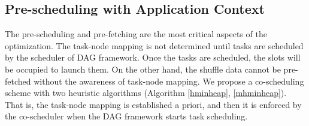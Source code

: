 \subsection{Pre-scheduling with Application Context}
The pre-scheduling and pre-fetching are the most critical aspects of the optimization. 
The task-node mapping is not determined until tasks are scheduled by the scheduler of DAG framework. 
Once the tasks are scheduled, the slots will be occupied to launch them. 
On the other hand, the shuffle data cannot be pre-fetched without the awareness of task-node mapping.
We propose a co-scheduling scheme with two heuristic algorithms (Algorithm \ref{hminheap}, \ref{mhminheap}). 
That is, the task-node mapping is established a priori, and then it is enforced by the co-scheduler when the DAG framework starts task scheduling. 

